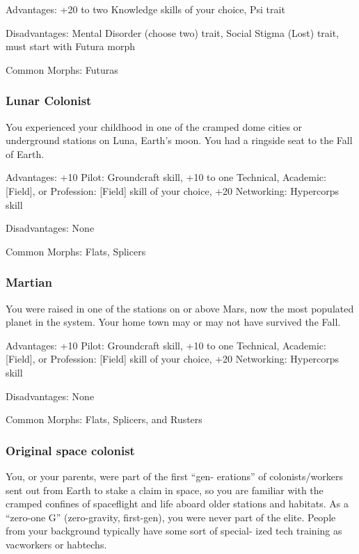  Advantages: +20 to two Knowledge skills of your
 choice, Psi trait
 
 Disadvantages: Mental Disorder (choose two) trait,
 Social Stigma (Lost) trait, must start with Futura
 morph

 Common Morphs: Futuras

\subsubsection{Lunar Colonist} %
 You experienced your childhood in one of the cramped
 dome cities or underground stations on Luna, Earth’s
 moon. You had a ringside seat to the Fall of Earth.

 Advantages: +10 Pilot: Groundcraft skill, +10 to one
 Technical, Academic: [Field], or Profession: [Field] skill
 of your choice, +20 Networking: Hypercorps skill

 Disadvantages: None

 Common Morphs: Flats, Splicers


\subsubsection{Martian} %

 You were raised in one of the stations on or above
 Mars, now the most populated planet in the system.
 Your home town may or may not have survived the
 Fall.
 
 Advantages: +10 Pilot: Groundcraft skill, +10 to one
 Technical, Academic: [Field], or Profession: [Field]
 skill of your choice, +20 Networking: Hypercorps
 skill
 
 Disadvantages: None

 Common Morphs: Flats, Splicers, and Rusters

\subsubsection{Original space colonist} %

 You, or your parents, were part of the first “gen-
 erations” of colonists/workers sent out from Earth to
 stake a claim in space, so you are familiar with the
 cramped confines of spaceflight and life aboard older
 stations and habitats. As a “zero-one G” (zero-gravity,
 first-gen), you were never part of the elite. People from
 your background typically have some sort of special-
 ized tech training as vacworkers or habtechs.

